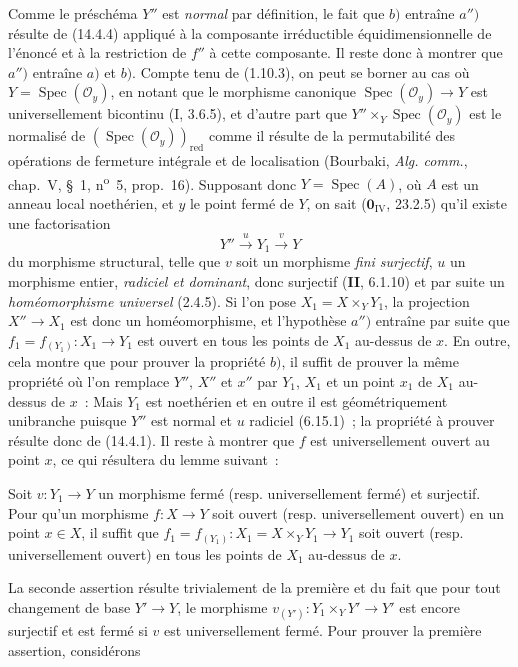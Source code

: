 Comme le préschéma $Y''$ est \emph{normal} par définition, le fait que $b)$ entraîne
$a'')$ résulte de (14.4.4) appliqué à la composante irréductible
équidimensionnelle de l'énoncé et à la restriction de $f''$ à cette composante. Il
reste donc à montrer que $a'')$ entraîne $a)$ et $b)$. Compte tenu de (1.10.3), on
peut se borner au cas où $Y=\operatorname{Spec}(\mathcal O_y)$, en notant que le
morphisme canonique $\operatorname{Spec}(\mathcal O_y)\to Y$ est universellement
bicontinu (I, 3.6.5), et d'autre part que
$Y''\times_Y\operatorname{Spec}(\mathcal O_y)$ est le normalisé de
$(\operatorname{Spec}(\mathcal O_y))_{\mathrm{red}}$ comme il résulte de la
permutabilité des opérations de fermeture intégrale et de localisation (Bourbaki,
\emph{Alg. comm.}, chap.~V, \S~1, n\textsuperscript{o}~5, prop.~16). Supposant donc
$Y=\operatorname{Spec}(A)$, où $A$ est un anneau local noethérien, et $y$ le point
fermé de $Y$, on sait ($\mathbf{0}_{\mathrm{IV}}$, 23.2.5) qu'il existe une
factorisation
\[
  Y''\xrightarrow{u}Y_1\xrightarrow{v}Y
\]
du morphisme structural, telle que $v$ soit un morphisme \emph{fini surjectif}, $u$
un morphisme entier, \emph{radiciel et dominant}, donc surjectif (\textbf{II},
6.1.10) et par suite un \emph{homéomorphisme universel} (2.4.5). Si l'on pose
$X_1=X\times_Y Y_1$, la projection $X''\to X_1$ est donc un homéomorphisme, et
l'hypothèse $a'')$ entraîne par suite que $f_1=f_{(Y_1)}:X_1\to Y_1$ est ouvert en
tous les points de $X_1$ au-dessus de $x$. En outre, cela montre que pour prouver
la propriété $b)$, il suffit de prouver la même propriété où l'on remplace $Y''$,
$X''$ et $x''$ par $Y_1$, $X_1$ et un point $x_1$ de $X_1$ au-dessus de $x$~: Mais
$Y_1$ est noethérien et en outre il est géométriquement unibranche puisque $Y''$
est normal et $u$ radiciel (6.15.1)~; la propriété à prouver résulte donc de
(14.4.1). Il reste à montrer que $f$ est universellement ouvert au point $x$, ce
qui résultera du lemme suivant~:

\begin{lemma}[14.4.8.1]
\label{IV.14.4.8.1-fr}
Soit $v:Y_1\to Y$ un morphisme fermé (resp. universellement fermé) et surjectif.
Pour qu'un morphisme $f:X\to Y$ soit ouvert (resp. universellement ouvert) en un
point $x\in X$, il suffit que $f_1=f_{(Y_1)}:X_1=X\times_Y Y_1\to Y_1$ soit ouvert
(resp. universellement ouvert) en tous les points de $X_1$ au-dessus de $x$.
\end{lemma}

La seconde assertion résulte trivialement de la première et du fait que pour tout
changement de base $Y'\to Y$, le morphisme
$v_{(Y')}:Y_1\times_Y Y'\to Y'$ est encore surjectif et est fermé si $v$ est
universellement fermé. Pour prouver la première assertion, considérons

